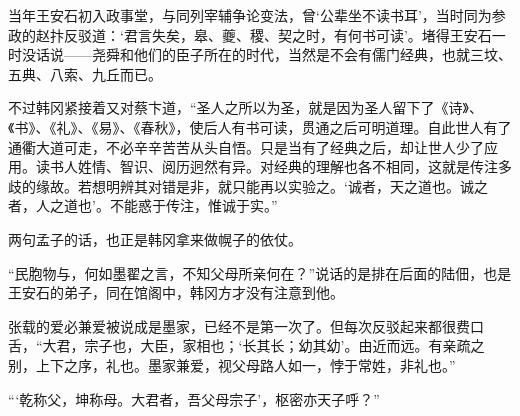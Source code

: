 当年王安石初入政事堂，与同列宰辅争论变法，曾‘公辈坐不读书耳’，当时同为参政的赵抃反驳道：‘君言失矣，皋、夔、稷、契之时，有何书可读’。堵得王安石一时没话说——尧舜和他们的臣子所在的时代，当然是不会有儒门经典，也就三坟、五典、八索、九丘而已。

不过韩冈紧接着又对蔡卞道，“圣人之所以为圣，就是因为圣人留下了《诗》、《书》、《礼》、《易》、《春秋》，使后人有书可读，贯通之后可明道理。自此世人有了通衢大道可走，不必辛辛苦苦从头自悟。只是当有了经典之后，却让世人少了应用。读书人姓情、智识、阅历迥然有异。对经典的理解也各不相同，这就是传注多歧的缘故。若想明辨其对错是非，就只能再以实验之。‘诚者，天之道也。诚之者，人之道也’。不能惑于传注，惟诚于实。”

两句孟子的话，也正是韩冈拿来做幌子的依仗。

“民胞物与，何如墨翟之言，不知父母所亲何在？”说话的是排在后面的陆佃，也是王安石的弟子，同在馆阁中，韩冈方才没有注意到他。

张载的爱必兼爱被说成是墨家，已经不是第一次了。但每次反驳起来都很费口舌，“大君，宗子也，大臣，家相也；‘长其长；幼其幼’。由近而远。有亲疏之别，上下之序，礼也。墨家兼爱，视父母路人如一，悖于常姓，非礼也。”

“‘乾称父，坤称母。大君者，吾父母宗子’，枢密亦天子呼？”
